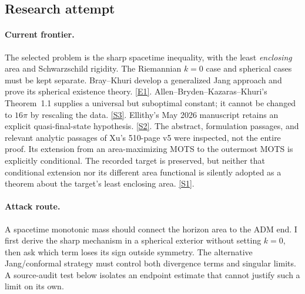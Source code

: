 \documentclass[11pt,a4paper]{article}
\newcommand{\sref}[2]{\hyperlink{source:#1:#2}{[S#2]}}
\newcommand{\eref}[2]{\hyperlink{extra:#1:#2}{[E#2]}}
\numberwithin{equation}{section}
\begin{document}
\subsection{Research attempt}

\paragraph{Current frontier.}
The selected problem is the sharp spacetime inequality, with the least
\emph{enclosing} area and Schwarzschild rigidity. The Riemannian $k=0$ case
and spherical cases must be kept separate. Bray--Khuri develop a generalized
Jang approach and prove its spherical existence theory. \eref{30006689}{1}.
Allen--Bryden--Kazaras--Khuri's Theorem~1.1 supplies a universal but suboptimal
constant; it cannot be changed to $16\pi$ by rescaling the data.
\sref{30006689}{3}. Ellithy's May 2026 manuscript retains an explicit quasi-final-state
hypothesis. \sref{30006689}{2}. The abstract, formulation passages, and relevant
analytic passages of Xu's 510-page v5 were inspected, not the entire proof.
Its extension from an area-maximizing MOTS to the outermost MOTS is explicitly
conditional. The recorded target is preserved, but neither that conditional
extension nor its different area functional is silently adopted as a theorem
about the target's least enclosing area. \sref{30006689}{1}.

\paragraph{Attack route.}
A spacetime monotonic mass should connect the horizon area to the ADM end.
I first derive the sharp mechanism in a spherical exterior without setting
$k=0$, then ask which term loses its sign outside symmetry. The alternative
Jang/conformal strategy must control both divergence terms and singular
limits. A source-audit test below isolates an endpoint estimate that cannot
justify such a limit on its own.
\end{document}
